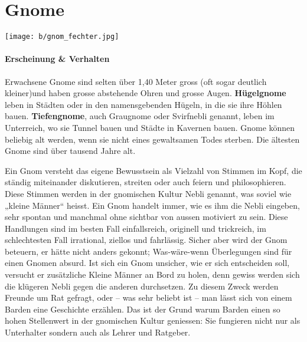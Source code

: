 \documentclass[10pt,twoside,twocolumn,openany]{book}
\begin{document}
\newpage \section{Gnome}
\begin{multicols}{2}
\texttt{[image: b/gnom\_fechter.jpg]}
\paragraph{Erscheinung \& Verhalten}	
Erwachsene Gnome sind selten über 1,40 Meter gross (oft sogar deutlich kleiner)und haben grosse abstehende Ohren und grosse Augen. \textbf{Hügelgnome} leben in Städten oder in den namensgebenden Hügeln, in die sie ihre Höhlen bauen. \textbf{Tiefengnome}, auch Graugnome oder Svirfnebli genannt, leben im Unterreich, wo sie Tunnel bauen und Städte in Kavernen bauen. Gnome können beliebig alt werden, wenn sie nicht eines gewaltsamen Todes sterben. Die ältesten Gnome sind über tausend Jahre alt.

Ein Gnom versteht das eigene Bewusstsein als Vielzahl von Stimmen im Kopf, die ständig miteinander diskutieren, streiten oder auch feiern und philosophieren. Diese Stimmen werden in der gnomischen Kultur Nebli genannt, was soviel wie „kleine Männer“ heisst.
Ein Gnom handelt immer, wie es ihm die Nebli eingeben, sehr spontan und manchmal ohne sichtbar von aussen motiviert zu sein. Diese Handlungen sind im besten Fall einfallsreich, originell und trickreich, im schlechtesten Fall irrational, ziellos und fahrlässig. Sicher aber wird der Gnom beteuern, er hätte nicht anders gekonnt; Was-wäre-wenn Überlegungen sind für einen Gnomen absurd. Ist sich ein Gnom unsicher, wie er sich entscheiden soll, versucht er zusätzliche Kleine Männer an Bord zu holen, denn gewiss werden sich die klügeren Nebli gegen die anderen durchsetzen.  Zu diesem Zweck werden Freunde um Rat gefragt, oder – was sehr beliebt ist – man lässt sich von einem Barden eine Geschichte erzählen. Das ist der Grund warum Barden einen so hohen Stellenwert in der gnomischen Kultur geniessen: Sie fungieren nicht nur als Unterhalter sondern auch als Lehrer und Ratgeber.

	

\end{multicols}
\end{document}
